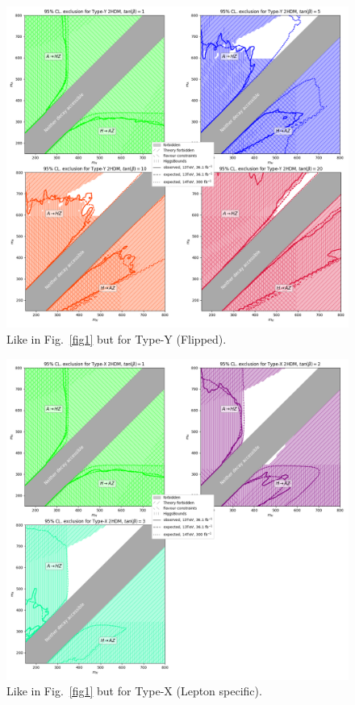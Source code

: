 \begin{figure}[t!]	     
    \includegraphics[width=\textwidth]{single_tbs/type3.png}
    \caption{Like in Fig.~\ref{fig1} but for Type-Y (Flipped).}\label{fig3}
\end{figure}

\begin{figure}[t!]
	\centering
    \includegraphics[width=\textwidth]{single_tbs/type4.png}
    \caption{Like in Fig.~\ref{fig1} but for  Type-X (Lepton specific).}\label{fig4}
\end{figure}



